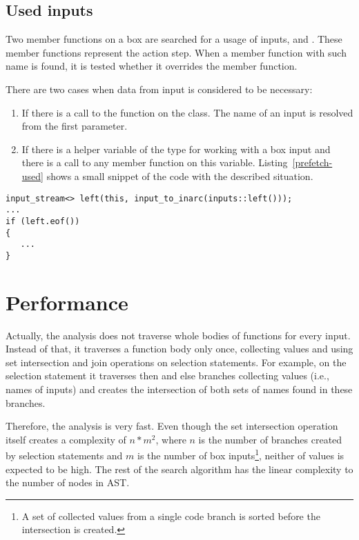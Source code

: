 \subsection{Used inputs}
\label{prefetch-used-inputs}
Two member functions on a box are searched for a usage of inputs,  and . These member functions represent the action step. When a member function with such name is found, it is tested whether it overrides the  member function.

There are two cases when data from input is considered to be necessary:

\begin{enumerate}
\item If there is a call to the  function on the  class. The name of an input is resolved from the first parameter.
\item If there is a helper variable of the type  for working with a box input and there is a call to any member function on this variable. Listing~\ref{prefetch-used} shows a small snippet of the code with the described situation.
\end{enumerate}

\begin{lstlisting}[caption={An example of a \textit{used} input.}, label={prefetch-used}]
input_stream<> left(this, input_to_inarc(inputs::left()));
...
if (left.eof())
{
   ...
}
\end{lstlisting}

\section{Performance}
Actually, the analysis does not traverse whole bodies of functions for every input. Instead of that, it traverses a function body only once, collecting values and using set intersection and join operations on selection statements. For example, on the  selection statement it traverses then and else branches collecting values (i.e., names of inputs) and creates the intersection of both sets of names found in these branches.

Therefore, the analysis is very fast. Even though the set intersection operation itself creates a complexity of $n*m^2$, where $n$ is the number of branches created by selection statements and $m$ is the number of box inputs\footnote{A set of collected values from a single code branch is sorted before the intersection is created.}, neither of values is expected to be high. The rest of the search algorithm has the linear complexity to the number of nodes in AST.

